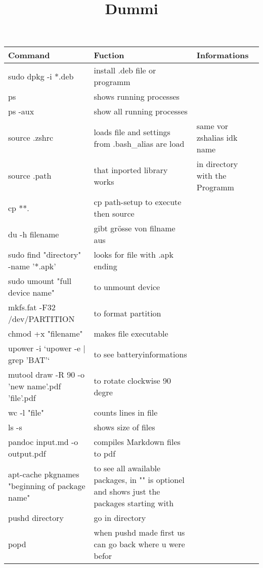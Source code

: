 \documentclass[12pt]{article}
\title{Dummi}
\begin{document}
\setlength{\parindent}{0pt}
\setlength{\parskip}{30pt}
\setlength{\baselineskip}{20pt}




\centering
\begin{tabular}{| p{6.5cm} | p{6.5cm} | p{6.5cm} |}
    \hline
    Command & Fuction & Informations \\
    \hline
    sudo dpkg -i *.deb & install .deb file or programm \\
    \hline
    ps & shows running processes & \\
    \hline
    ps -aux & show all running processes & \\
    \hline
    source .zshrc & loads file and settings from .bash\_alias are load & same vor zshalias idk name  \\
    \hline
    source .path & that inported library works & in directory with the Programm \\
    \hline 
    cp **. & cp path-setup to execute then source &\\
    \hline
    du -h filename & gibt grösse von filname aus & \\
    \hline
    sudo find "directory" -name '*.apk' & looks for file with .apk ending &\\
    \hline 
    sudo umount "full device name" & to unmount device & \\
    \hline 
    mkfs.fat -F32 /dev/PARTITION & to format partition &\\
    \hline 
    chmod +x "filename" & makes file executable &\\
    \hline
    upower -i `upower -e | grep 'BAT'` & to see batteryinformations &\\
    \hline
    mutool draw -R 90 -o 'new name'.pdf 'file'.pdf & to rotate clockwise 90 degre &\\
    \hline 
    wc -l "file" & counts lines in file &\\
    \hline
    ls -s & shows size of files &\\
    \hline
    pandoc input.md -o output.pdf & compiles Markdown files to pdf & \\
    \hline
    apt-cache pkgnames "beginning of package name"& to see all awailable packages, in "" is optionel and shows just the packages starting with &\\
    \hline
    pushd directory & go in directory & \\
    \hline 
    popd & when pushd made first us can go back where u were befor &\\
    \hline

\end{tabular}
\end{document}
